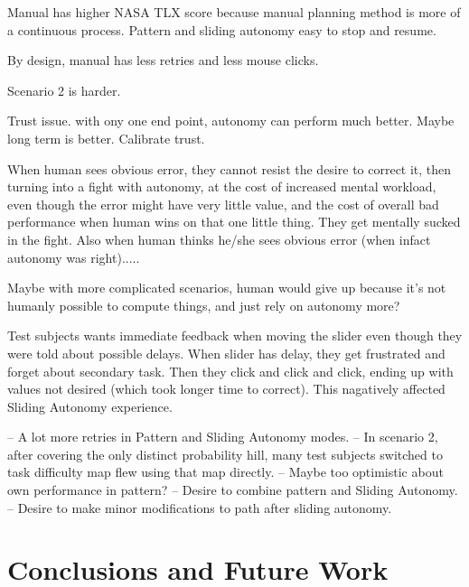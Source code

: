 \documentclass[journal]{IEEEtran}
\begin{document}
Manual has higher NASA TLX score because manual planning method is more of a continuous process. Pattern and sliding autonomy easy to stop and resume.

By design, manual has less retries and less mouse clicks.

Scenario 2 is harder.

Trust issue. with ony one end point, autonomy can perform much better. Maybe long term is better. Calibrate trust.

When human sees obvious error, they cannot resist the desire to correct it, then turning into a fight with autonomy, at the cost of increased mental workload, even though the error might have very little value, and the cost of overall bad performance when human wins on that one little thing. They get mentally sucked in the fight. Also when human thinks he/she sees obvious error (when infact autonomy was right).....

Maybe with more complicated scenarios, human would give up because it's not humanly possible to compute things, and just rely on autonomy more?

Test subjects wants immediate feedback when moving the slider even though they were told about possible delays. When slider has delay, they get frustrated and forget about secondary task. Then they click and click and click, ending up with values not desired (which took longer time to correct). This nagatively affected Sliding Autonomy experience.


-- A lot more retries in Pattern and Sliding Autonomy modes.
-- In scenario 2, after covering the only distinct probability hill, many test subjects switched to task difficulty map flew using that map directly.
-- Maybe too optimistic about own performance in pattern?
-- Desire to combine pattern and Sliding Autonomy.
-- Desire to make minor modifications to path after sliding autonomy.


\section{Conclusions and Future Work} 
\label{sec:Conclusions6}
\end{document}
